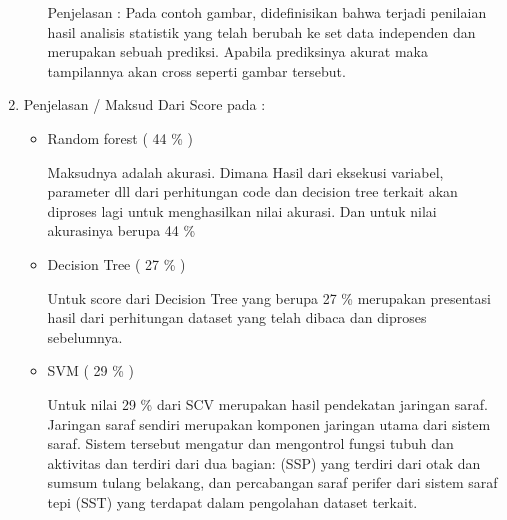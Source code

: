 \begin{enumerate}
\begin{itemize}
\par Penjelasan : Pada contoh gambar, didefinisikan bahwa terjadi penilaian hasil analisis statistik yang telah berubah ke set data independen dan merupakan sebuah prediksi. Apabila prediksinya akurat maka tampilannya akan cross seperti gambar tersebut.
\par
\end{itemize}
\par
\item Penjelasan / Maksud Dari Score pada :
\begin{itemize}
\item Random forest ( 44 \% )
\par Maksudnya adalah akurasi. Dimana Hasil dari eksekusi variabel, parameter dll dari perhitungan code dan decision tree terkait akan diproses lagi untuk menghasilkan nilai akurasi. Dan untuk nilai akurasinya berupa 44 \%
\par
\item Decision Tree ( 27 \% )
\par Untuk score dari Decision Tree yang berupa 27 \% merupakan presentasi hasil dari perhitungan dataset yang telah dibaca dan diproses sebelumnya.
\par
\item SVM ( 29 \% )
\par Untuk nilai 29 \% dari SCV merupakan hasil pendekatan jaringan saraf. Jaringan saraf sendiri merupakan komponen jaringan utama dari sistem saraf. Sistem tersebut mengatur dan mengontrol fungsi tubuh dan aktivitas dan terdiri dari dua bagian:  (SSP) yang terdiri dari otak dan sumsum tulang belakang, dan percabangan saraf perifer dari sistem saraf tepi (SST) yang terdapat dalam pengolahan dataset terkait. 
\par


\end{itemize}
\end{enumerate}
